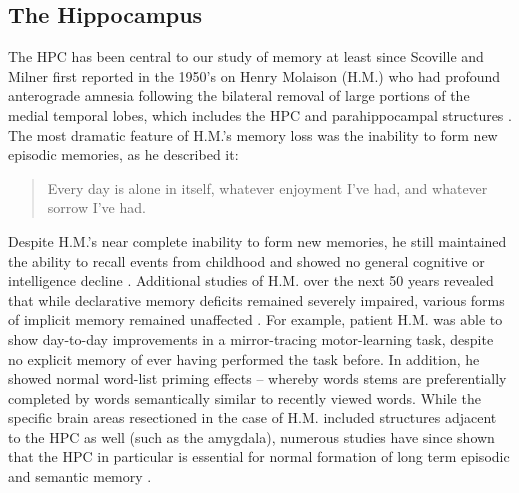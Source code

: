 \subsection{The Hippocampus}\label{sec:intro:memory:hpc}
The \ac{HPC} has been central to our study of memory at least since Scoville and Milner first reported in the 1950's on Henry Molaison (H.M.) who had profound anterograde amnesia following the bilateral removal of large portions of the medial temporal lobes, which includes the \ac{HPC} and parahippocampal structures \citep{Scoville1957}.
The most dramatic feature of H.M.'s memory loss was the inability to form new episodic memories, as he described it:
\begin{quote}
Every day is alone in itself, whatever enjoyment I've had, and whatever sorrow I've had.
\end{quote}
Despite H.M.'s near complete inability to form new memories, he still maintained the ability to recall events from childhood and showed no general cognitive or intelligence decline \citep{Squire2009}.
Additional studies of H.M. over the next 50 years revealed that while declarative memory deficits remained severely impaired, various forms of implicit memory remained unaffected \citep{Corkin2002}.
For example, patient H.M. was able to show day-to-day improvements in a mirror-tracing motor-learning task, despite no explicit memory of ever having performed the task before.
In addition, he showed normal word-list priming effects -- whereby words stems are preferentially completed by words semantically similar to recently viewed words. 
While the specific brain areas resectioned in the case of H.M. included structures adjacent to the \ac{HPC} as well (such as the amygdala), numerous studies have since shown that the \ac{HPC} in particular is essential for normal formation of long term episodic and semantic memory \citep[reviewd in][]{Eichenbaum2000, Burgess2002}.

